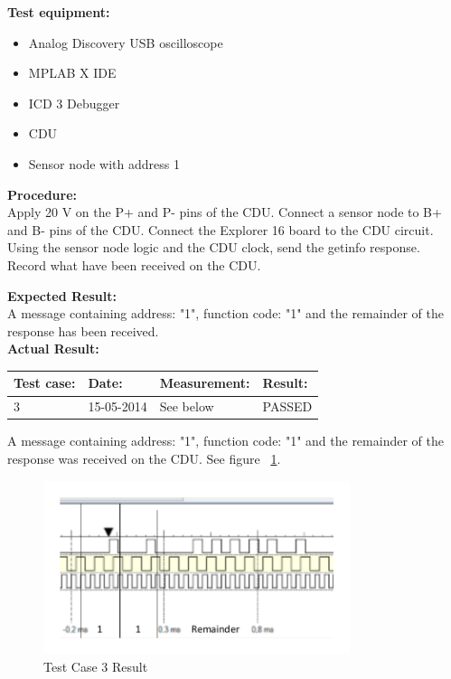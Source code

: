\textbf{Test equipment:}
\begin{itemize}
\item Analog Discovery USB oscilloscope
\item MPLAB X IDE
\item ICD 3 Debugger
\item CDU
\item Sensor node with address 1
\end{itemize}

\textbf{Procedure:}\\
Apply 20 V on the P+ and P- pins of the CDU. Connect a sensor node to B+ and B- pins of the CDU. Connect the Explorer 16 board to the CDU circuit. Using the sensor node logic and the CDU clock, send the getinfo response. Record what have been received on the CDU.

\textbf{Expected Result:}\\
A message containing address: "1", function code: "1" and the remainder of the response has been received.\\

\textbf{Actual Result:}\\
\begin{table}[H]
\centering
\begin{tabular}{|p{2cm}|p{2cm}|p{3cm}|p{2cm}|}\hline
\textbf{Test case:} & \textbf{Date:} & \textbf{Measurement:} & \textbf{Result:} \\ \hline
3 & 15-05-2014 & See below & PASSED \\ \hline
\end{tabular}
\end{table}
A message containing address: "1", function code: "1" and the remainder of the response was received on the CDU. See figure ~\ref{fig:InteTestCase3}.
\begin{figure}[H]
\centering
\includegraphics[width=0.8\textwidth]{billeder/intetestcase3}
\caption{Test Case 3 Result}
\label{fig:InteTestCase3}
\end{figure}

